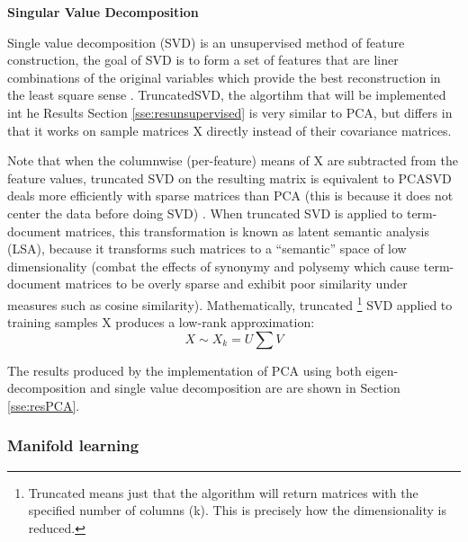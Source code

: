 \documentclass[11pt]{article}
\theoremstyle{definition}
\theoremstyle{remark}
\begin{document}
{\textbf{Singular Value Decomposition}

Single value decomposition (SVD) is an unsupervised method of feature construction, the goal of SVD is to form a set of features that are liner combinations of the original variables which provide the best reconstruction in the least square sense \cite{duda2012pattern}. TruncatedSVD, the algortihm that will be implemented  int he Results Section \ref{sse:resunsupervised} is very similar to PCA, but differs in that it works on sample matrices X directly instead of their covariance matrices. 

Note that when the columnwise (per-feature) means of X are subtracted from the feature values, truncated SVD on the resulting matrix is equivalent to PCASVD deals more efficiently with sparse matrices than PCA (this is because it does not center the data before doing SVD) \cite{halko2009finding}. When truncated SVD is applied to term-document matrices, this transformation is known as latent semantic analysis (LSA), because it transforms such matrices to a “semantic” space of low dimensionality (combat the effects of synonymy and polysemy which cause term-document matrices to be overly sparse and exhibit poor similarity under measures such as cosine similarity).
Mathematically, truncated \footnote{Truncated means just that the algorithm will return matrices with the specified number of columns (k). This is precisely how the dimensionality is reduced.} SVD applied to training samples X produces a low-rank approximation:
\begin{equation}
X \sim X_k = U \sum V
\end{equation}

The results produced by the implementation of PCA using both eigen-decomposition and single value decomposition are are shown in Section \ref{sse:resPCA}.


\subsubsection{Manifold learning}
\label{sse:manifold}

}
\end{document}
